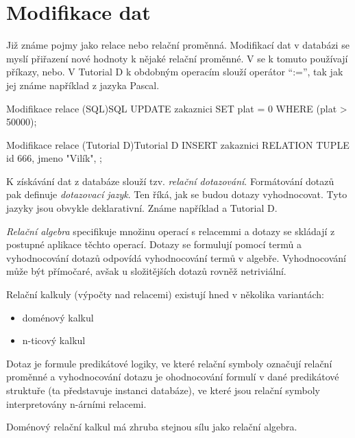 \section{Modifikace dat}
Již známe pojmy jako relace nebo relační proměnná. Modifikací dat v databázi se myslí přiřazení nové hodnoty k nějaké relační proměnné. V  se k tomuto používají příkazy, nebo. V Tutorial D k obdobným operacím slouží operátor \enquote{:=}, tak jak jej známe například z jazyka Pascal.
\begin{upcode}{Modifikace relace (SQL)}{}{SQL}
UPDATE	zakaznici
SET		plat = 0
WHERE	(plat > 50000);
\end{upcode}
\begin{upcode}{Modifikace relace (Tutorial D)}{}{Tutorial D}
INSERT zakaznici RELATION {TUPLE {id 666, jmeno "Vilík", }};
\end{upcode}
K získávání dat z databáze slouží tzv. \textit{relační dotazování}. Formátování dotazů pak definuje \textit{dotazovací jazyk}. Ten říká, jak se budou dotazy vyhodnocovat. Tyto jazyky jsou obvykle deklarativní. Známe například  a Tutorial D.

\textit{Relační algebra} specifikuje množinu operací s relacemmi a dotazy se skládají z postupné aplikace těchto operací. Dotazy se formulují pomocí termů a vyhodnocování dotazů odpovídá vyhodnocování termů v algebře. Vyhodnocování může být přímočaré, avšak u složitějších dotazů rovněž netriviální.

Relační kalkuly (výpočty nad relacemi) existují hned v několika variantách:
\begin{itemize}
\item doménový kalkul
\item n-ticový kalkul
\end{itemize}
Dotaz je formule predikátové logiky, ve které relační symboly označují relační proměnné a vyhodnocování dotazu je ohodnocování formulí v dané predikátové struktuře (ta představuje instanci databáze), ve které jsou relační symboly interpretovány n-árními relacemi.

Doménový relační kalkul má zhruba stejnou sílu jako relační algebra.

